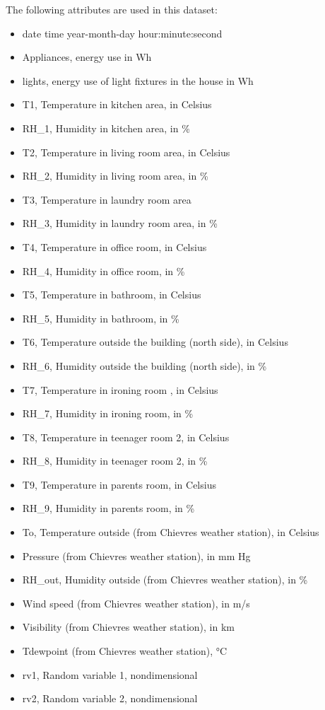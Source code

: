 \documentclass[]{article}
\providecommand{\tightlist}{%
  \setlength{\itemsep}{0pt}\setlength{\parskip}{0pt}}
\begin{document}
The following attributes are used in this dataset:

\begin{itemize}
\tightlist
\item
  date time year-month-day hour:minute:second
\item
  Appliances, energy use in Wh
\item
  lights, energy use of light fixtures in the house in Wh
\item
  T1, Temperature in kitchen area, in Celsius
\item
  RH\_1, Humidity in kitchen area, in \%
\item
  T2, Temperature in living room area, in Celsius
\item
  RH\_2, Humidity in living room area, in \%
\item
  T3, Temperature in laundry room area
\item
  RH\_3, Humidity in laundry room area, in \%
\item
  T4, Temperature in office room, in Celsius
\item
  RH\_4, Humidity in office room, in \%
\item
  T5, Temperature in bathroom, in Celsius
\item
  RH\_5, Humidity in bathroom, in \%
\item
  T6, Temperature outside the building (north side), in Celsius
\item
  RH\_6, Humidity outside the building (north side), in \%
\item
  T7, Temperature in ironing room , in Celsius
\item
  RH\_7, Humidity in ironing room, in \%
\item
  T8, Temperature in teenager room 2, in Celsius
\item
  RH\_8, Humidity in teenager room 2, in \%
\item
  T9, Temperature in parents room, in Celsius
\item
  RH\_9, Humidity in parents room, in \%
\item
  To, Temperature outside (from Chievres weather station), in Celsius
\item
  Pressure (from Chievres weather station), in mm Hg
\item
  RH\_out, Humidity outside (from Chievres weather station), in \%
\item
  Wind speed (from Chievres weather station), in m/s
\item
  Visibility (from Chievres weather station), in km
\item
  Tdewpoint (from Chievres weather station), °C
\item
  rv1, Random variable 1, nondimensional
\item
  rv2, Random variable 2, nondimensional
\end{itemize}
\end{document}
